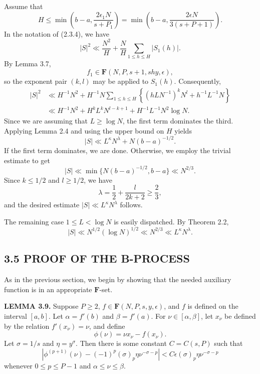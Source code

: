 \documentclass[10pt]{article}
\newcommand{\Fclass}{\mathbf{F}}
\begin{document}
Assume that
\[
 H\leq\min\left(b-a,\frac{2\epsilon_1N}{s+P_1}\right)
 =\min\left(b-a,\frac{2\epsilon N}{3(s+P+1)}\right).
\]
In the notation of (2.3.4), we have
\[
 |S|^2\ll\frac{N^2}{H}+\frac NH\sum_{1\leq h\leq H}|S_1(h)|.
\]
By Lemma 3.7,
\[
 f_1\in\Fclass(N,P,s+1,shy,\epsilon),
\]
so the exponent pair $(k,l)$ may be applied to $S_1(h)$. Consequently,
\[
\begin{aligned}
 |S|^2
 &\ll H^{-1}N^2+H^{-1}N\sum_{1\leq h\leq H}
 \left\{(hLN^{-1})^kN^l+h^{-1}L^{-1}N\right\} \\
 &\ll H^{-1}N^2+H^kL^kN^{l-k+1}
      +H^{-1}L^{-1}N^2\log N.
\end{aligned}
\]
Since we are assuming that $L\geq\log N$, the first term dominates the
third. Applying Lemma 2.4 and using the upper bound on $H$ yields
\[
 |S|\ll L^\kappa N^\lambda+N(b-a)^{-1/2}.
\]
If the first term dominates, we are done. Otherwise, we employ the trivial
estimate to get
\[
 |S|\ll\min\{N(b-a)^{-1/2},b-a\}\ll N^{2/3}.
\]
Since $k\leq1/2$ and $l\geq1/2$, we have
\[
 \lambda=\frac12+\frac{l}{2k+2}\geq\frac23,
\]
and the desired estimate $|S|\ll L^\kappa N^\lambda$ follows.

The remaining case $1\leq L<\log N$ is easily dispatched. By Theorem 2.2,
\[
 |S|\ll N^{1/2}(\log N)^{1/2}\ll N^{2/3}
 \ll L^\kappa N^\lambda.
\]

\subsection*{3.5 PROOF OF THE B-PROCESS}

As in the previous section, we begin by showing that the needed auxiliary
function is in an appropriate $\Fclass$-set.

\medskip
\noindent\textbf{LEMMA 3.9.}
Suppose $P\geq2$, $f\in\Fclass(N,P,s,y,\epsilon)$, and $f$ is defined on the
interval $[a,b]$. Let $\alpha=f'(b)$ and $\beta=f'(a)$. For
$\nu\in[\alpha,\beta]$, let $x_\nu$ be defined by the relation
$f'(x_\nu)=\nu$, and define
\[
 \phi(\nu)=\nu x_\nu-f(x_\nu).
\]
Let $\sigma=1/s$ and $\eta=y^\sigma$. Then there is some constant
$C=C(s,P)$ such that
\[
 \left|\phi^{(p+1)}(\nu)-(-1)^p(\sigma)_p\eta\nu^{-\sigma-p}\right|
 <C\epsilon(\sigma)_p\eta\nu^{-\sigma-p}
\]
whenever $0\leq p\leq P-1$ and $\alpha\leq\nu\leq\beta$.
\end{document}
